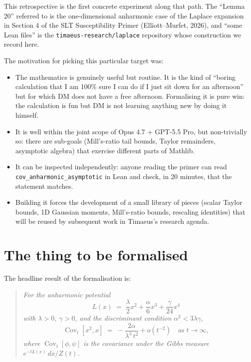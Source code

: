 \documentclass[11pt]{article}
\begin{document}
This retrospective is the first concrete experiment along that path. The
``Lemma 20'' referred to is the one-dimensional anharmonic case of the
Laplace expansion in Section 4 of the SLT Susceptibility Primer
(Elliott--Murfet, 2026), and ``some Lean files'' is the
\texttt{timaeus-research/laplace} repository whose construction we record
here.

The motivation for picking this particular target was:
\begin{itemize}
\item The mathematics is genuinely useful but routine. It is the kind of
``boring calculation that I am 100\% sure I can do if I just sit down for
an afternoon'' but for which DM does not have a free afternoon. Formalising
it is pure win: the calculation is fun but DM is not learning anything new
by doing it himself.
\item It is well within the joint scope of Opus 4.7 + GPT-5.5 Pro, but
non-trivially so: there are sub-goals (Mill's-ratio tail bounds, Taylor
remainders, asymptotic algebra) that exercise different parts of Mathlib.
\item It can be inspected independently: anyone reading the primer can read
\texttt{cov\_anharmonic\_asymptotic} in Lean and check, in 20 minutes,
that the statement matches.
\item Building it forces the development of a small library of pieces
(scalar Taylor bounds, 1D Gaussian moments, Mill's-ratio bounds, rescaling
identities) that will be reused by subsequent work in Timaeus's research
agenda.
\end{itemize}

\section{The thing to be formalised}

The headline result of the formalisation is:

\begin{quote}\itshape
For the anharmonic potential
\[
  L(x) \;=\; \frac{\lambda}{2}x^2 + \frac{\alpha}{6}x^3 + \frac{\gamma}{24}x^4
\]
with $\lambda > 0$, $\gamma > 0$, and the discriminant condition
$\alpha^2 < 3\lambda\gamma$,
\[
  \operatorname{Cov}_t[x^2,x]
  \;=\; -\frac{2\alpha}{\lambda^3\,t^2} + o(t^{-2})
  \quad\text{as } t\to\infty,
\]
where $\operatorname{Cov}_t[\phi,\psi]$ is the covariance under the Gibbs
measure $e^{-tL(x)}\,dx / Z(t)$.
\end{quote}
\end{document}
